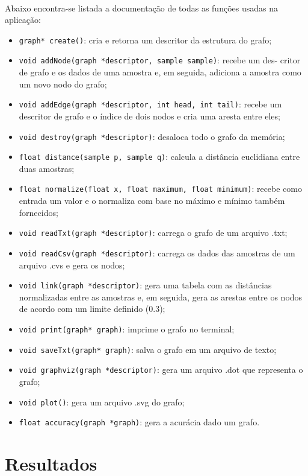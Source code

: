 \documentclass{article}
\begin{document}
		\paragraph{} Abaixo encontra-se listada a documentação de todas as funções usadas na aplicação:
        \begin{itemize}
			\item \texttt{graph* create()}: cria e retorna um descritor da estrutura do grafo;
			\item \texttt{void addNode(graph *descriptor, sample sample)}: recebe um des- critor de grafo e os dados de uma amostra e, em seguida, adiciona a amostra como um novo nodo do grafo;
			\item \texttt{void addEdge(graph *descriptor, int head, int tail)}: recebe um descritor de grafo e o índice de dois nodos e cria uma aresta entre eles;
			\item \texttt{void destroy(graph *descriptor)}: desaloca todo o grafo da memória;
			\item \texttt{float distance(sample p, sample q)}: calcula a distância euclidiana entre duas amostras;
			\item \texttt{float normalize(float x, float maximum, float minimum)}: recebe como entrada um valor e o normaliza com base no máximo e mínimo também fornecidos;
			\item \texttt{void readTxt(graph *descriptor)}: carrega o grafo de um arquivo .txt;
			\item \texttt{void readCsv(graph *descriptor)}: carrega os dados das amostras de um arquivo .cvs e gera os nodos;
			\item \texttt{void link(graph *descriptor)}: gera uma tabela com as distâncias normalizadas entre as amostras e, em seguida, gera as arestas entre os nodos de acordo com um limite definido (0.3);
			\item \texttt{void print(graph* graph)}: imprime o grafo no terminal;
			\item \texttt{void saveTxt(graph* graph)}: salva o grafo em um arquivo de texto;
			\item \texttt{void graphviz(graph *descriptor)}: gera um arquivo .dot que representa o grafo;
			\item \texttt{void plot()}: gera um arquivo .svg do grafo;
			\item \texttt{float accuracy(graph *graph)}: gera a acurácia dado um grafo.
		\end{itemize}

    \section{Resultados}
\end{document}
